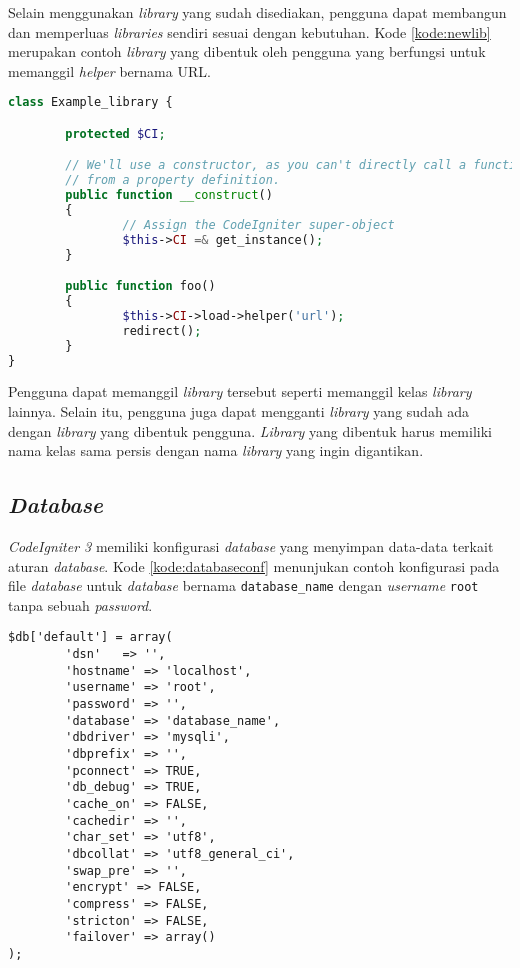 Selain menggunakan \textit{library} yang sudah disediakan, pengguna dapat membangun dan memperluas \textit{libraries} sendiri sesuai dengan kebutuhan. Kode \ref{kode:newlib} merupakan contoh \textit{library} yang dibentuk oleh pengguna yang berfungsi untuk memanggil \textit{helper} bernama URL.

\begin{lstlisting}[language=PHP, caption=Contoh \textit{library} yang dibentuk, label=kode:newlib]
class Example_library {

        protected $CI;

        // We'll use a constructor, as you can't directly call a function
        // from a property definition.
        public function __construct()
        {
                // Assign the CodeIgniter super-object
                $this->CI =& get_instance();
        }

        public function foo()
        {
                $this->CI->load->helper('url');
                redirect();
        }
}
\end{lstlisting}

Pengguna dapat memanggil \textit{library} tersebut seperti memanggil kelas \textit{library} lainnya. Selain itu, pengguna juga dapat mengganti \textit{library} yang sudah ada dengan \textit{library} yang dibentuk pengguna. \textit{Library} yang dibentuk harus memiliki nama kelas sama persis dengan nama \textit{library} yang ingin digantikan.

\subsection{\textit{Database}}
\textit{CodeIgniter 3} memiliki konfigurasi \textit{database} yang menyimpan data-data terkait aturan \textit{database}. Kode \ref{kode:databaseconf} menunjukan contoh konfigurasi pada file \textit{database} untuk \textit{database} bernama \texttt{database\_name} dengan \textit{username} \texttt{root} tanpa sebuah \textit{password}.

\begin{lstlisting}[caption=Contoh konfigurasi \textit{database}, label=kode:databaseconf]
$db['default'] = array(
        'dsn'   => '',
        'hostname' => 'localhost',
        'username' => 'root',
        'password' => '',
        'database' => 'database_name',
        'dbdriver' => 'mysqli',
        'dbprefix' => '',
        'pconnect' => TRUE,
        'db_debug' => TRUE,
        'cache_on' => FALSE,
        'cachedir' => '',
        'char_set' => 'utf8',
        'dbcollat' => 'utf8_general_ci',
        'swap_pre' => '',
        'encrypt' => FALSE,
        'compress' => FALSE,
        'stricton' => FALSE,
        'failover' => array()
);
\end{lstlisting}


